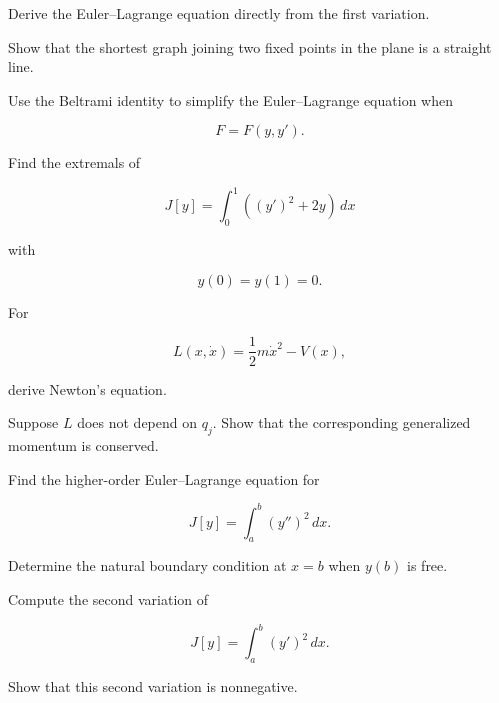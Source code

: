 \begin{exercise}[2]
Derive the Euler--Lagrange equation directly from the first variation.
\end{exercise}

\begin{exercise}[2]
Show that the shortest graph joining two fixed points in the plane is a
straight line.
\end{exercise}

\begin{exercise}[2]
Use the Beltrami identity to simplify the Euler--Lagrange equation when

\[
F=F(y,y').
\]
\end{exercise}

\begin{exercise}[2]
Find the extremals of

\[
J[y]
=
\int_0^1
\left(
(y')^2+2y
\right)\,dx
\]

with

\[
y(0)=y(1)=0.
\]
\end{exercise}

\begin{exercise}[2]
For

\[
L(x,\dot x)
=
\frac12m\dot x^2-V(x),
\]

derive Newton's equation.
\end{exercise}

\begin{exercise}[2]
Suppose \(L\) does not depend on \(q_j\). Show that the corresponding
generalized momentum is conserved.
\end{exercise}

\begin{exercise}[2]
Find the higher-order Euler--Lagrange equation for

\[
J[y]
=
\int_a^b
(y'')^2\,dx.
\]
\end{exercise}

\begin{exercise}[2]
Determine the natural boundary condition at \(x=b\) when \(y(b)\) is
free.
\end{exercise}

\begin{exercise}[2]
Compute the second variation of

\[
J[y]
=
\int_a^b
(y')^2\,dx.
\]
\end{exercise}

\begin{exercise}[2]
Show that this second variation is nonnegative.
\end{exercise}

